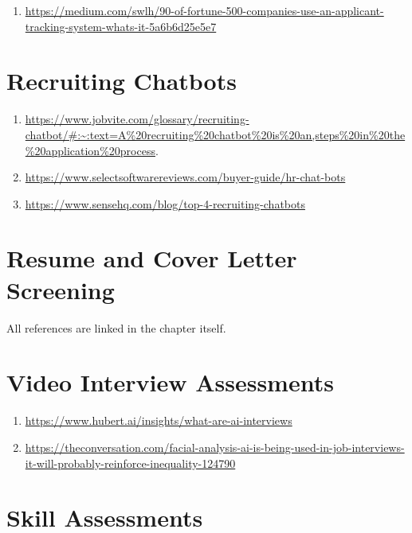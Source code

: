 \documentclass[
]{book}
\providecommand{\tightlist}{%
  \setlength{\itemsep}{0pt}\setlength{\parskip}{0pt}}
\begin{document}
\begin{enumerate}
\def\labelenumi{\arabic{enumi}.}
\tightlist
\item
  \url{https://medium.com/swlh/90-of-fortune-500-companies-use-an-applicant-tracking-system-whats-it-5a6b6d25e5e7}
\end{enumerate}

\hypertarget{recruiting-chatbots-1}{%
\section{Recruiting Chatbots}\label{recruiting-chatbots-1}}

\begin{enumerate}
\def\labelenumi{\arabic{enumi}.}
\item
  \url{https://www.jobvite.com/glossary/recruiting-chatbot/\#:~:text=A\%20recruiting\%20chatbot\%20is\%20an,steps\%20in\%20the\%20application\%20process}.
\item
  \url{https://www.selectsoftwarereviews.com/buyer-guide/hr-chat-bots}
\item
  \url{https://www.sensehq.com/blog/top-4-recruiting-chatbots}
\end{enumerate}

\hypertarget{resume-and-cover-letter-screening-1}{%
\section{Resume and Cover Letter Screening}\label{resume-and-cover-letter-screening-1}}

All references are linked in the chapter itself.

\hypertarget{video-interview-assessments-1}{%
\section{Video Interview Assessments}\label{video-interview-assessments-1}}

\begin{enumerate}
\def\labelenumi{(\arabic{enumi})}
\item
  \url{https://www.hubert.ai/insights/what-are-ai-interviews}
\item
  \url{https://theconversation.com/facial-analysis-ai-is-being-used-in-job-interviews-it-will-probably-reinforce-inequality-124790}
\end{enumerate}

\hypertarget{skill-assessments-1}{%
\section{Skill Assessments}\label{skill-assessments-1}}
\end{document}
